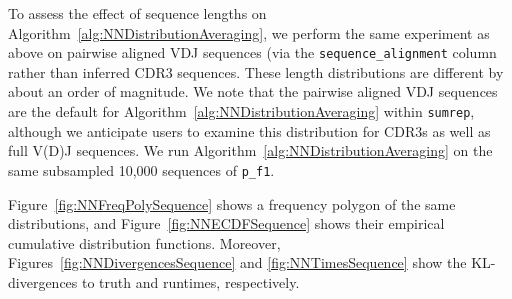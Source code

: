 \documentclass{article}
\begin{document}
To assess the effect of sequence lengths on Algorithm~\ref{alg:NNDistributionAveraging}, we perform the same experiment as above on pairwise aligned VDJ sequences (via the \texttt{sequence\_alignment} column rather than inferred CDR3 sequences.
These length distributions are different by about an order of magnitude.
We note that the pairwise aligned VDJ sequences are the default for Algorithm~\ref{alg:NNDistributionAveraging} within \texttt{sumrep}, although we anticipate users to examine this distribution for CDR3s as well as full V(D)J sequences.
We run Algorithm~\ref{alg:NNDistributionAveraging} on the same subsampled 10,000 sequences of \texttt{p\_f1}.

Figure~\ref{fig:NNFreqPolySequence} shows a frequency polygon of the same distributions, and Figure~\ref{fig:NNECDFSequence} shows their empirical cumulative distribution functions.
Moreover, Figures~\ref{fig:NNDivergencesSequence} and \ref{fig:NNTimesSequence} show the KL-divergences to truth and runtimes, respectively.
\end{document}

